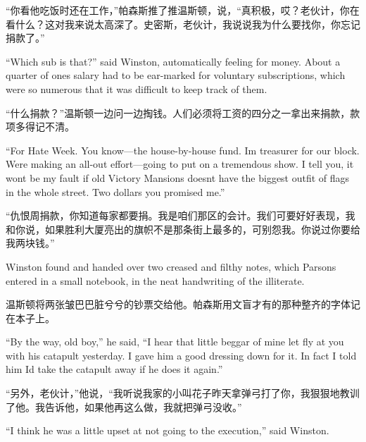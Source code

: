 \begin{paracol}{2}
\switchcolumn

``你看他吃饭时还在工作，''帕森斯推了推温斯顿，说，``真积极，哎？老伙计，你在看什么？这对我来说太高深了。史密斯，老伙计，我说说我为什么要找你，你忘记捐款了。''

\switchcolumn*

``Which sub is that?'' said Winston, automatically feeling for money.
About a quarter of one\textquotesingle s salary had to be ear-marked for
voluntary subscriptions, which were so numerous that it was difficult to
keep track of them.

\switchcolumn

``什么捐款？''温斯顿一边问一边掏钱。人们必须将工资的四分之一拿出来捐款，款项多得记不清。

\switchcolumn*

``For Hate Week. You know---the house-by-house fund. I\textquotesingle m
treasurer for our block. We\textquotesingle re making an all-out
effort---going to put on a tremendous show. I tell you, it
won\textquotesingle t be my fault if old Victory Mansions
doesn\textquotesingle t have the biggest outfit of flags in the whole
street. Two dollars you promised me.''

\switchcolumn

``仇恨周捐款，你知道每家都要捐。我是咱们那区的会计。我们可要好好表现，我和你说，如果胜利大厦亮出的旗帜不是那条街上最多的，可别怨我。你说过你要给我两块钱。''

\switchcolumn*

Winston found and handed over two creased and filthy notes, which
Parsons entered in a small notebook, in the neat handwriting of the
illiterate.

\switchcolumn

温斯顿将两张皱巴巴脏兮兮的钞票交给他。帕森斯用文盲才有的那种整齐的字体记在本子上。

\switchcolumn*

``By the way, old boy,'' he said, ``I hear that little beggar of mine let
fly at you with his catapult yesterday. I gave him a good dressing down
for it. In fact I told him I\textquotesingle d take the catapult away if
he does it again.''

\switchcolumn

``另外，老伙计，''他说，``我听说我家的小叫花子昨天拿弹弓打了你，我狠狠地教训了他。我告诉他，如果他再这么做，我就把弹弓没收。''

\switchcolumn*

``I think he was a little upset at not going to the execution,'' said
Winston.


\end{paracol}
